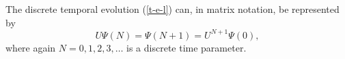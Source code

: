 The discrete temporal evolution (\ref{t-e-l}) can, in matrix
notation, be represented by
\begin{equation}
U\Psi (N)= \Psi (N+1)=U^{N+1}\Psi (0),
\label{t-e-l2}
\end{equation}
where again $N=0,1,2,3,\ldots$ is a discrete time parameter.





